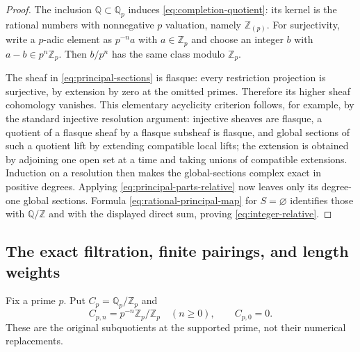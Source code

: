 \begin{proof}
The inclusion $\mathbb Q\subset\mathbb Q_p$ induces
\eqref{eq:completion-quotient}: its kernel is the rational numbers with
nonnegative $p$ valuation, namely $\mathbb Z_{(p)}$. For surjectivity,
write a $p$-adic element as $p^{-n}a$ with $a\in\mathbb Z_p$ and choose
an integer $b$ with $a-b\in p^n\mathbb Z_p$. Then $b/p^n$ has the same
class modulo $\mathbb Z_p$.

The sheaf in \eqref{eq:principal-sections} is flasque: every restriction
projection is surjective, by extension by zero at the omitted primes.
Therefore its higher sheaf cohomology vanishes. This elementary
acyclicity criterion follows, for example, by the standard injective
resolution argument: injective sheaves are flasque, a quotient of a
flasque sheaf by a flasque subsheaf is flasque, and global sections
of such a quotient lift by extending compatible local lifts; the
extension is obtained by adjoining one open set at a time and taking
unions of compatible extensions. Induction on a resolution then makes
the global-sections complex exact in positive degrees.
Applying \eqref{eq:principal-parts-relative} now leaves only its
degree-one global sections. Formula \eqref{eq:rational-principal-map}
for $S=\varnothing$ identifies those with $\mathbb Q/\mathbb Z$ and
with the displayed direct sum, proving \eqref{eq:integer-relative}.
\end{proof}

\subsection{The exact filtration, finite pairings, and length weights}

Fix a prime $p$. Put $C_p=\mathbb Q_p/\mathbb Z_p$ and
\[
 C_{p,n}=p^{-n}\mathbb Z_p/\mathbb Z_p\quad(n\ge0),
 \qquad C_{p,0}=0.
 \tag{RP27}\label{eq:prime-filtration}
\]
These are the original subquotients at the supported prime, not their
numerical replacements.

